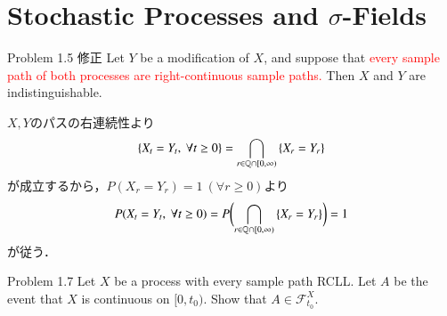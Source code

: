 \section{Stochastic Processes and $\sigma$-Fields}
\begin{itembox}[l]{Problem 1.5 修正}
	Let $Y$ be a modification of $X$, and suppose that \textcolor{red}{every 
	sample path of both processes are right-continuous sample paths.} 
	Then $X$ and $Y$ are indistinguishable.
\end{itembox}

\begin{prf}
	$X,Y$のパスの右連続性より
	\begin{align}
		\left\{ X_t = Y_t,\ \forall t \geq 0 \right\}
		= \bigcap_{r \in \mathbb{Q} \cap [0,\infty)} \left\{ X_r = Y_r \right\}
	\end{align}
	が成立するから，$P(X_r = Y_r) = 1\   (\forall r \geq 0)$より
	\begin{align}
		P(X_t = Y_t,\ \forall t \geq 0)
		= P \biggl( \bigcap_{r \in \mathbb{Q} \cap [0,\infty)} \left\{ X_r = Y_r \right\} \biggr)
		= 1
	\end{align}
	が従う．
	\QED
\end{prf}

\begin{itembox}[l]{Problem 1.7}
		Let $X$ be a process with every sample path RCLL. 
		Let $A$ be the event that $X$ is continuous on $[0,t_0)$. 
		Show that $A \in \mathscr{F}^X_{t_0}$.
\end{itembox}

